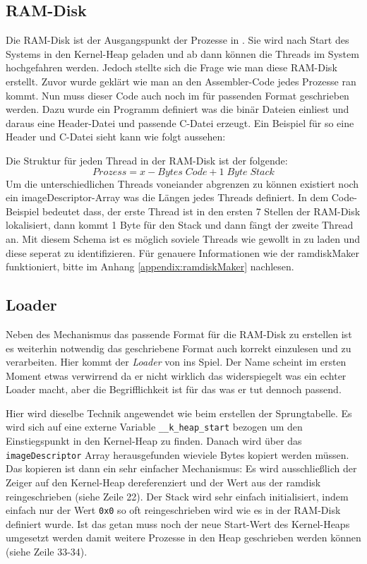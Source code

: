 \subsection{RAM-Disk}
Die RAM-Disk ist der Ausgangspunkt der Prozesse in \mops. Sie wird nach Start des Systems in den Kernel-Heap geladen und ab dann k\"onnen die Threads im System hochgefahren werden. Jedoch stellte sich die Frage wie man diese RAM-Disk erstellt. Zuvor wurde gekl\"art wie man an den Assembler-Code jedes Prozesse ran kommt. Nun muss dieser Code auch noch im f\"ur \mops passenden Format geschrieben werden. Dazu wurde ein Programm definiert was die bin\"ar Dateien einliest und daraus eine Header-Datei und passende C-Datei erzeugt. Ein Beispiel f\"ur so eine Header und C-Datei sieht kann wie folgt aussehen:

\newpage

Die Struktur f\"ur jeden Thread in der RAM-Disk ist der folgende:
$$Prozess = x-Bytes\;Code + 1\;Byte\;Stack$$
Um die unterschiedlichen Threads voneiander abgrenzen zu k\"onnen existiert noch ein imageDescriptor-Array was die L\"angen jedes Threads definiert. In dem Code-Beispiel bedeutet dass, der erste Thread ist in den ersten 7 Stellen der RAM-Disk lokalisiert, dann kommt 1 Byte f\"ur den Stack und dann f\"angt der zweite Thread an. Mit diesem Schema ist es m\"oglich soviele Threads wie gewollt in \mops zu laden und diese seperat zu identifizieren. F\"ur genauere Informationen wie der ramdiskMaker funktioniert, bitte im Anhang \ref{appendix:ramdiskMaker} nachlesen.
\subsection{\mops Loader}
Neben des Mechanismus das passende Format f\"ur die RAM-Disk zu erstellen ist es weiterhin notwendig das geschriebene Format auch korrekt einzulesen und zu verarbeiten. Hier kommt der \textit{Loader} von \mops ins Spiel. Der Name scheint im ersten Moment etwas verwirrend da er nicht wirklich das widerspiegelt was ein echter Loader macht, aber die Begrifflichkeit ist f\"ur das was er tut dennoch passend. 

Hier wird dieselbe Technik angewendet wie beim erstellen der Sprungtabelle. Es wird sich auf eine externe Variable \texttt{\_\_k\_heap\_start} bezogen um den Einstiegspunkt in den Kernel-Heap zu finden. Danach wird \"uber das \texttt{imageDescriptor} Array herausgefunden wieviele Bytes kopiert werden m\"ussen. Das kopieren ist dann ein sehr einfacher Mechanismus: Es wird ausschlie\ss lich der Zeiger auf den Kernel-Heap dereferenziert und der Wert aus der ramdisk reingeschrieben (siehe Zeile 22). Der Stack wird sehr einfach initialisiert, indem einfach nur der Wert \texttt{0x0} so oft reingeschrieben wird wie es in der RAM-Disk definiert wurde. Ist das getan muss noch der neue Start-Wert des Kernel-Heaps umgesetzt werden damit weitere Prozesse in den Heap geschrieben werden k\"onnen (siehe Zeile 33-34).
